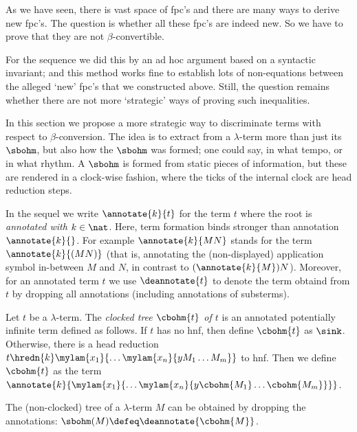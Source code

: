 
As we have seen, there is vast space of fpc's
and there are many ways to derive new fpc's.
The question is whether all these fpc's are indeed new.
So we have to prove that they are not $\beta$-convertible.

For the \bohm{} sequence we did this by an ad hoc argument
based on a syntactic invariant; 
and this method works fine to establish lots of non-equations
between the alleged `new' fpc's that we constructed above.
Still, the question remains whether there are 
not more `strategic' ways of proving such inequalities. 

In this section we propose a more strategic way 
to discriminate terms with respect to $\beta$-conversion.
The idea is to extract from a $\lambda$-term more than just its $\sbohm$,
but also how the $\sbohm$ was formed; 
one could say, in what tempo, or in what rhythm.
A $\sbohm$ is formed from static pieces of information,
but these are rendered in a clock-wise fashion,
where the ticks of the internal clock are head reduction steps.

In the sequel we write $\annotate{k}{t}$ for
the term $t$ where the root is \emph{annotated with $k\in\nat$}.
Here, term formation binds stronger than annotation $\annotate{k}{}$.
For example $\annotate{k}{M N}$ stands for the term $\annotate{k}{(M N)}$
(that is, annotating the (non-displayed) application symbol in-between $M$ and $N$,
in contrast to $(\annotate{k}{M}) N$).
Moreover, for an annotated term $t$ we use $\deannotate{t}$
to denote the term obtaind from $t$ by dropping all annotations (including annotations of substerms).

\begin{definition}\label{def:cbohm}
  Let $t$ be a $\lambda$-term.
  The \emph{clocked \bohm{} tree $\cbohm{t}$ of $t$}
  is an annotated potentially infinite term defined as follows.
  If $t$ has no hnf, then define $\cbohm{t}$ as $\sink$.
Otherwise,
  there is a head reduction $t \hredn{k} \mylam{x_1}{\ldots\mylam{x_n}{y M_1 \ldots M_m}}$ to hnf.
  Then we define 
  $\cbohm{t}$ as the term $\annotate{k}{\mylam{x_1}{\ldots\mylam{x_n}{y \cbohm{M_1} \ldots \cbohm{M_m}}}}$.
\end{definition}
\noindent
The (non-clocked) \boehm{} tree of a $\lambda$-term $M$
can be obtained by dropping the annotations:
$\sbohm(M) \defeq \deannotate{\cbohm{M}}$.



